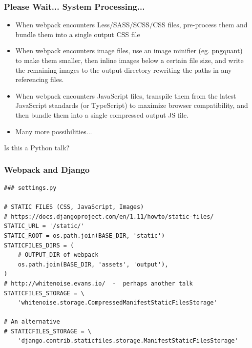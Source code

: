 \documentclass[handout]{beamer}
\begin{document}
\begin{frame}
\frametitle{Please Wait... System Processing...}
  {\scriptsize
    \begin{itemize}
      \item {When webpack encounters Less/SASS/SCSS/CSS files, pre-process them and bundle them into a single output CSS file}
      \item {When webpack encounters image files, use an image minifier (eg. pngquant) to make them smaller, then inline images below a certain file size, and write the remaining images to the output directory rewriting the paths in any referencing files.}
      \item {When webpack encounters JavaScript files, transpile them from the latest JavaScript standards (or TypeScript) to maximize browser compatibility, and then bundle them into a single compressed output JS file.}
      \item {Many more possibilities...}
    \end{itemize}
  }
\end{frame}


\begin{frame}
  Is this a Python talk?
\end{frame}



\begin{frame}[fragile]
\frametitle{Webpack and Django}

{\scriptsize
\begin{verbatim}
### settings.py

# STATIC FILES (CSS, JavaScript, Images)
# https://docs.djangoproject.com/en/1.11/howto/static-files/
STATIC_URL = '/static/'
STATIC_ROOT = os.path.join(BASE_DIR, 'static')
STATICFILES_DIRS = (
    # OUTPUT_DIR of webpack
    os.path.join(BASE_DIR, 'assets', 'output'),
)
# http://whitenoise.evans.io/  -  perhaps another talk
STATICFILES_STORAGE = \
    'whitenoise.storage.CompressedManifestStaticFilesStorage'

# An alternative
# STATICFILES_STORAGE = \
    'django.contrib.staticfiles.storage.ManifestStaticFilesStorage'
\end{verbatim}
}
\end{frame}
\end{document}
